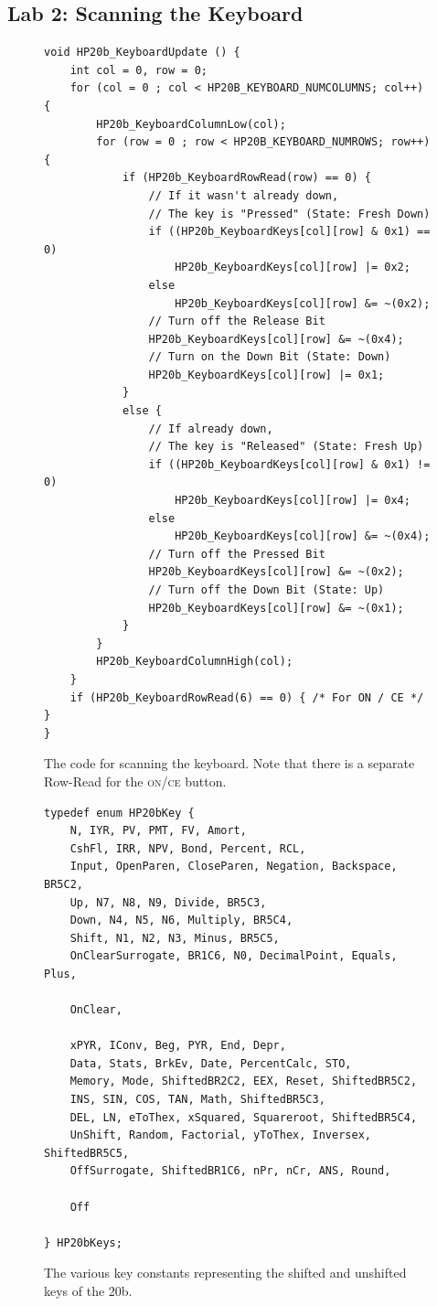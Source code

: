 \documentclass{LibHP20b}
\begin{document}
\subsection{Lab 2: Scanning the Keyboard}
\label{sec:scanning}
\begin{figure}
\begin{lstlisting}
void HP20b_KeyboardUpdate () {
	int col = 0, row = 0;
	for (col = 0 ; col < HP20B_KEYBOARD_NUMCOLUMNS; col++) {
		HP20b_KeyboardColumnLow(col);
		for (row = 0 ; row < HP20B_KEYBOARD_NUMROWS; row++) {
			if (HP20b_KeyboardRowRead(row) == 0) {
				// If it wasn't already down,
				// The key is "Pressed" (State: Fresh Down)
				if ((HP20b_KeyboardKeys[col][row] & 0x1) == 0)
					HP20b_KeyboardKeys[col][row] |= 0x2;
				else
					HP20b_KeyboardKeys[col][row] &= ~(0x2);
				// Turn off the Release Bit
				HP20b_KeyboardKeys[col][row] &= ~(0x4);
				// Turn on the Down Bit (State: Down)
				HP20b_KeyboardKeys[col][row] |= 0x1;
			}
			else {
				// If already down,
				// The key is "Released" (State: Fresh Up)
				if ((HP20b_KeyboardKeys[col][row] & 0x1) != 0)
					HP20b_KeyboardKeys[col][row] |= 0x4;
				else
					HP20b_KeyboardKeys[col][row] &= ~(0x4);
				// Turn off the Pressed Bit
				HP20b_KeyboardKeys[col][row] &= ~(0x2);
				// Turn off the Down Bit (State: Up)
				HP20b_KeyboardKeys[col][row] &= ~(0x1);
			}
		}
		HP20b_KeyboardColumnHigh(col);
	}
	if (HP20b_KeyboardRowRead(6) == 0) { /* For ON / CE */ }
}
\end{lstlisting}
\label{fig:lab2}
\caption{The code for scanning the keyboard. Note that there is a separate Row-Read for the \textsc{on/ce} button.}
\end{figure}

\begin{figure}
\begin{lstlisting}
typedef enum HP20bKey {
	N, IYR, PV, PMT, FV, Amort,
	CshFl, IRR, NPV, Bond, Percent, RCL,
	Input, OpenParen, CloseParen, Negation, Backspace, BR5C2,
	Up, N7, N8, N9, Divide, BR5C3,
	Down, N4, N5, N6, Multiply, BR5C4,
	Shift, N1, N2, N3, Minus, BR5C5,
	OnClearSurrogate, BR1C6, N0, DecimalPoint, Equals, Plus,
	
	OnClear,

	xPYR, IConv, Beg, PYR, End, Depr,
	Data, Stats, BrkEv, Date, PercentCalc, STO,
	Memory, Mode, ShiftedBR2C2, EEX, Reset, ShiftedBR5C2,
	INS, SIN, COS, TAN, Math, ShiftedBR5C3,
	DEL, LN, eToThex, xSquared, Squareroot, ShiftedBR5C4,
	UnShift, Random, Factorial, yToThex, Inversex, ShiftedBR5C5,
	OffSurrogate, ShiftedBR1C6, nPr, nCr, ANS, Round,
	
	Off
	
} HP20bKeys;
\end{lstlisting}
\label{fig:lab2keyconstants}
\caption{The various key constants representing the shifted and unshifted keys of the 20b.}
\end{figure}
\end{document}
